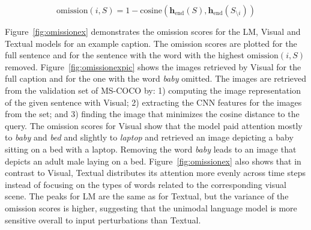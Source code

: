 \begin{equation}
\label{eg:omit}
\mathrm{omission}(i,S) = 1-\mathrm{cosine}(\mathbf{h}_\text{end}(S),
\mathbf{h}_\text{end}(S_{\setminus i}))
\end{equation}

\noindent Figure~\ref{fig:omissionex} demonstrates the omission
scores for the {\sc LM}, {\sc Visual} and {\sc Textual} models for an
example caption. The omission scores are
plotted for the
full sentence and for the sentence with the word with the highest
$\mathrm{omission}(i,S)$ removed. 
Figure~\ref{fig:omissionexpic} shows the images retrieved by {\sc
  Visual} for the full
caption and for the one with the word {\it baby} omitted. 
The images are retrieved from the validation set of MS-COCO by: 1)
computing the image representation of the given sentence with {\sc
  Visual}; 2) extracting the CNN features for the images from the set;
and 3) finding the image that minimizes the cosine distance to the
query.\label{edit:retrievalexplain} 
The omission scores for {\sc Visual} show that the model paid attention
mostly to {\it baby} and {\it bed} and slightly to {\it laptop} and
retrieved an image depicting a baby sitting on a bed with a laptop.
Removing the word {\it baby} leads to an image that depicts an adult
male laying on a bed. Figure~\ref{fig:omissionex} also shows that in
contrast to {\sc Visual}, {\sc Textual} distributes
its attention more evenly across time steps instead of focusing on the
types of words related to the corresponding visual scene. The peaks
for {\sc LM} are the same as for {\sc Textual}, but the variance of
the omission scores is higher, suggesting that the unimodal language
model is more sensitive overall to input perturbations than {\sc Textual}.




